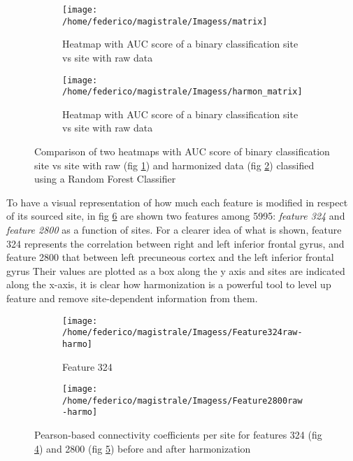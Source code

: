 \documentclass[12pt]{report}
\begin{document}
\begin{figure}
\centering
\begin{subfigure}[b]{0.8\textwidth}
   \texttt{[image: /home/federico/magistrale/Imagess/matrix]}
   \caption{Heatmap with AUC score of a binary classification site vs site with raw data}
   \label{fig:heatmap_harmonization_harmon}
\end{subfigure}

\begin{subfigure}[b]{0.8\textwidth}
   \texttt{[image: /home/federico/magistrale/Imagess/harmon\_matrix]}
   \caption{Heatmap with AUC score of a binary classification site vs site with raw data}
   \label{fig:heatmap_harmonization_noharmon}
\end{subfigure}

\caption{Comparison of two heatmaps with AUC score of binary classification site vs site with raw (fig \ref{fig:heatmap_harmonization_harmon}) and harmonized data (fig \ref{fig:heatmap_harmonization_noharmon}) classified using a Random Forest Classifier
}
\label{fig:heatmap_harmonization}
\end{figure}

To have a visual representation of how much each feature is modified in respect of its sourced site, in fig \ref{fig:features_raw-harmo} are shown two features among 5995: \emph{feature 324} and \emph{feature 2800} as a function of sites.
For a clearer idea of what is shown, feature 324 represents the correlation between right and left inferior frontal gyrus, and feature 2800 that between left precuneous cortex and the left inferior frontal gyrus
Their values are plotted as a box along the y axis and sites are indicated along the x-axis, it is clear how harmonization is a powerful tool to level up feature and remove site-dependent information from them.

\begin{figure}
\centering
\begin{subfigure}[b]{1.\textwidth}
   \texttt{[image: /home/federico/magistrale/Imagess/Feature324raw-harmo]}
   \caption{Feature 324 }
   \label{fig:feature324}
\end{subfigure}
\begin{subfigure}[b]{1.\textwidth}
   \texttt{[image: /home/federico/magistrale/Imagess/Feature2800raw-harmo]}
   \caption{}
   \label{fig:feature2800}
\end{subfigure}
\caption{Pearson-based connectivity coefficients per site for features 324 (fig \ref{fig:feature324}) and 2800 (fig \ref{fig:feature2800}) before and after harmonization}
\label{fig:features_raw-harmo}
\end{figure}
\end{document}
